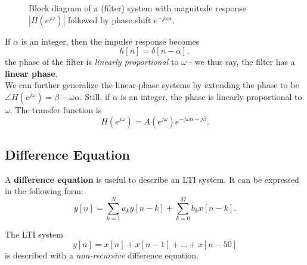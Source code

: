 \begin{figure}[H]
    \centering
    \caption{Block diagram of a (filter) system with magnitude response $|H(e^{j\omega})|$ followed by phase shift $e^{-j\omega \alpha}$.}
    \label{fig:linear_phase_filter}
\end{figure}

If $\alpha$ is an integer, then the impulse response becomes
\[
    h[n] = \delta[n-\alpha],
\]
the phase of the filter is \textit{linearly proportional} to $\omega$ - we thus say, the filter has a \textbf{linear phase}. \\

We can further generalize the linear-phase systems by extending the phase to be $\angle H(e^{j\omega}) = \beta -\omega \alpha$. Still, if $\alpha$ is an integer, the phase is linearly proportional to $\omega$. The transfer function is
\[
     H(e^{j\omega}) =  A(e^{j\omega})  e^{-j\omega \alpha + j \beta}.
\]


\subsection{Difference Equation}
A \textbf{difference equation} is useful to describe an LTI system. It can be expressed in the following form:
\[
    y[n] = \sum_{k=1}^{N} a_{k}y[n-k] + \sum_{k=0}^{M} b_{k}x[n-k].
\]
\begin{ex}{}
    The LTI system
    \[
        y[n] = x[n] + x[n-1] + ... + x[n-50]
    \]
    is described with a \textit{non-recursive} difference equation.
\end{ex}

